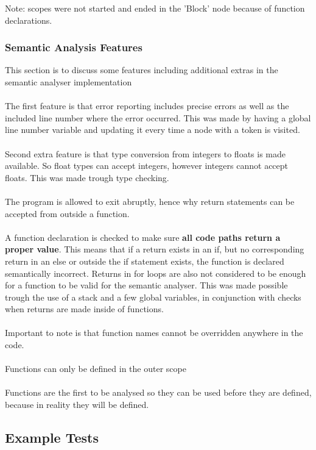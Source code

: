 Note: scopes were not started and ended in the 'Block' node because of function declarations.

\subsubsection{Semantic Analysis Features}
This section is to discuss some features including additional extras in the semantic analyser implementation
\\\\
The first feature is that error reporting includes precise errors as well as the included line number where the error occurred. This was made by having a global line number variable and updating it every time a node with a token is visited.
\\\\
Second extra feature is that type conversion from integers to floats is made available. So float types can accept integers, however integers cannot accept floats. This was made trough type checking.
\\\\
The program is allowed to exit abruptly, hence why return statements can be accepted from outside a function.
\\\\
A function declaration is checked to make sure \textbf{all code paths return a proper value}. This means that if a return exists in an if, but no corresponding return in an else or outside the if statement exists, the function is declared semantically incorrect. Returns in for loops are also not considered to be enough for a function to be valid for the semantic analyser. This was made possible trough the use of a stack and a few global variables, in conjunction with checks when returns are made inside of functions.
\\\\
Important to note is that function names cannot be overridden anywhere in the code.
\\\\
Functions can only be defined in the outer scope
\\\\
Functions are the first to be analysed so they can be used before they are defined, because in reality they will be defined.

\subsection{Example Tests}


